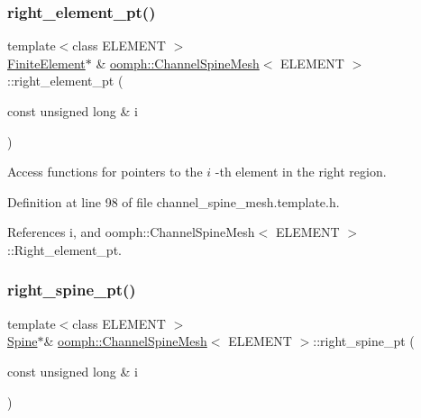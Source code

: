 \subsubsection{\texorpdfstring{right\+\_\+element\+\_\+pt()}{right\_element\_pt()}}
{\footnotesize\ttfamily template$<$class E\+L\+E\+M\+E\+NT $>$ \\
\hyperlink{classoomph_1_1FiniteElement}{Finite\+Element}$\ast$ \& \hyperlink{classoomph_1_1ChannelSpineMesh}{oomph\+::\+Channel\+Spine\+Mesh}$<$ E\+L\+E\+M\+E\+NT $>$\+::right\+\_\+element\+\_\+pt (\begin{DoxyParamCaption}\item[{const unsigned long \&}]{i }\end{DoxyParamCaption})\hspace{0.3cm}{\ttfamily [inline]}}



Access functions for pointers to the $ i $ -\/th element in the right region. 



Definition at line 98 of file channel\+\_\+spine\+\_\+mesh.\+template.\+h.



References i, and oomph\+::\+Channel\+Spine\+Mesh$<$ E\+L\+E\+M\+E\+N\+T $>$\+::\+Right\+\_\+element\+\_\+pt.

\mbox{\label{classoomph_1_1ChannelSpineMesh_a78a52a2e61a76bff0fa74b3fd2583092}} 
\subsubsection{\texorpdfstring{right\+\_\+spine\+\_\+pt()}{right\_spine\_pt()}}
{\footnotesize\ttfamily template$<$class E\+L\+E\+M\+E\+NT $>$ \\
\hyperlink{classoomph_1_1Spine}{Spine}$\ast$\& \hyperlink{classoomph_1_1ChannelSpineMesh}{oomph\+::\+Channel\+Spine\+Mesh}$<$ E\+L\+E\+M\+E\+NT $>$\+::right\+\_\+spine\+\_\+pt (\begin{DoxyParamCaption}\item[{const unsigned long \&}]{i }\end{DoxyParamCaption})\hspace{0.3cm}{\ttfamily [inline]}}



